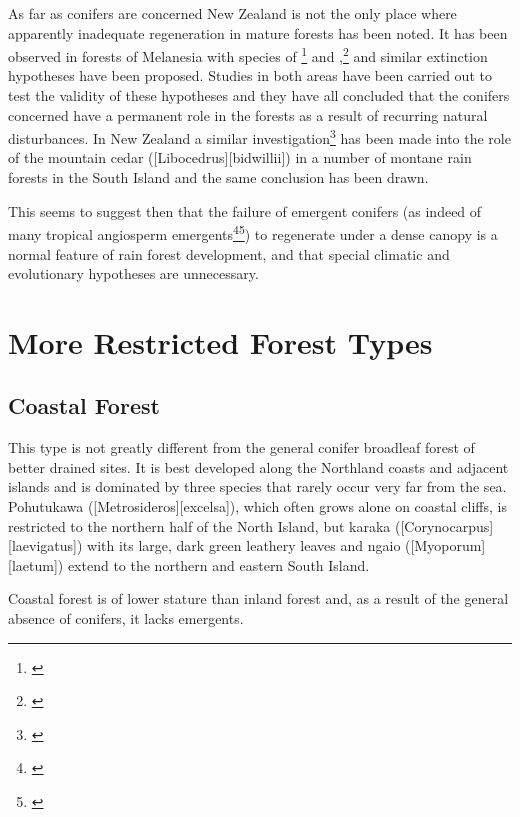 As far as conifers are concerned New Zealand is not the only place where apparently inadequate regeneration in mature forests has been noted.
It has been observed in forests of Melanesia with species of \footnote{\cite{havel1971araucaria}} and ,\footnote{\cite{whitmore1966social}} and similar extinction hypotheses have been proposed.
Studies in both areas have been carried out to test the validity of these hypotheses and they have all concluded that the conifers concerned have a permanent role in the forests as a result of recurring natural disturbances.
In New Zealand a similar investigation\footnote{\cite{veblen1982conifer}} has been made into the role of the mountain cedar ([Libocedrus][bidwillii]) in a number of montane rain forests in the South Island and the same conclusion has been drawn.

This seems to suggest then that the failure of emergent conifers (as indeed of many tropical angiosperm emergents\footnote{\cite{whitmore1975tropical}}\footnote{\cite{jones1956ecological}}) to regenerate under a dense canopy is a normal feature of rain forest development, and that special climatic and evolutionary hypotheses are unnecessary.

\section{More Restricted Forest Types}

\subsection{Coastal Forest}

This type is not greatly different from the general conifer broadleaf forest of better drained sites.
It is best developed along the Northland coasts and adjacent islands and is dominated by three species that rarely occur very far from the sea.
Pohutukawa ([Metrosideros][excelsa]), which often grows alone on coastal cliffs, is restricted to the northern half of the North Island, but karaka ([Corynocarpus][laevigatus]) with its large, dark green leathery leaves and ngaio ([Myoporum][laetum]) extend to the northern and eastern South Island.

Coastal forest is of lower stature than inland forest and, as a result of the general absence of conifers, it lacks emergents.

